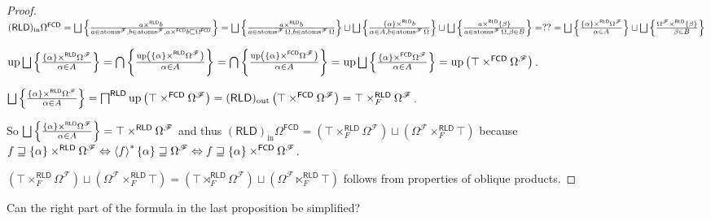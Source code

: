 \begin{proof}
  
  $(\mathsf{RLD})_{\operatorname{in}} \Omega^{\mathsf{FCD}} = \bigsqcup
  \setcond{ a \times^{\mathsf{RLD}} b }{ a \in
  \atoms^{\mathscr{F}}, b \in \atoms^{\mathscr{F}}, a
  \times^{\mathsf{FCD}} b \sqsubseteq \Omega^{\mathsf{FCD}}
  } = 
  \bigsqcup \setcond{ a\times^{\mathsf{RLD}} b}{ a \in \atoms^{\mathscr{F}} \Omega, b \in \atoms^{\mathscr{F}} \Omega } \sqcup
  \bigsqcup \setcond{ \{ \alpha \} \times^{\mathsf{RLD}} b
  }{ \alpha \in A, b \in \atoms^{\mathscr{F}}
  \Omega } \sqcup \bigsqcup \setcond{ a \times^{\mathsf{RLD}} \{
  \beta \} }{ a \in \atoms^{\mathscr{F}}
  \Omega, \beta \in B } = ?? = \bigsqcup \setcond{ \{ \alpha \}
  \times^{\mathsf{RLD}} \Omega^{\mathscr{F}} }{
  \alpha \in A } \sqcup \bigsqcup \setcond{
  \Omega^{\mathscr{F}} \times^{\mathsf{RLD}} \{ \beta \} }{
  \hspace{1em} \beta \in B }$
  
  $\up \bigsqcup \setcond{ \{ \alpha \} \times^{\mathsf{RLD}}
  \Omega^{\mathscr{F}} }{ \alpha \in A } =
  \bigcap \setcond{ \up \left( \{ \alpha \} \times^{\mathsf{RLD}}
  \Omega^{\mathscr{F}} \right) }{ \alpha \in A
  } = \bigcap \setcond{ \up \left( \{ \alpha \}
  \times^{\mathsf{FCD}} \Omega^{\mathscr{F}} \right) }{
  \alpha \in A } = \up \bigsqcup \setcond{ \{ \alpha
  \} \times^{\mathsf{FCD}} \Omega^{\mathscr{F}} }{
  \alpha \in A } = \up \left( \top
  \times^{\mathsf{FCD}} \Omega^{\mathscr{F}} \right)$.
  
  $\bigsqcup \setcond{ \{ \alpha \} \times^{\mathsf{RLD}}
  \Omega^{\mathscr{F}} }{ \alpha \in A } =
  \bigsqcap^{\mathsf{RLD}} \up \left( \top
  \times^{\mathsf{FCD}} \Omega^{\mathscr{F}} \right) =
  (\mathsf{RLD})_{\operatorname{out}}  \left( \top \times^{\mathsf{FCD}}
  \Omega^{\mathscr{F}} \right) = \top \times^{\mathsf{RLD}}_F
  \Omega^{\mathscr{F}}$.
  
  So $\bigsqcup \setcond{ \{ \alpha \} \times^{\mathsf{RLD}}
  \Omega^{\mathscr{F}} }{ \alpha \in A } =
  \top \times^{\mathsf{RLD}} \Omega^{\mathscr{F}}$ and thus
  $(\mathsf{RLD})_{\operatorname{in}} \Omega^{\mathsf{FCD}} = \left(
  \top \times^{\mathsf{RLD}}_F \Omega^{\mathscr{F}} \right) \sqcup
  \left( \Omega^{\mathscr{F}} \times^{\mathsf{RLD}}_F \top \right)$
  because
  $f \sqsupseteq \{ \alpha \} \times^{\mathsf{RLD}}
  \Omega^{\mathscr{F}} \Leftrightarrow \left\langle f\right\rangle ^{\ast} \{ \alpha \}
  \sqsupseteq \Omega^{\mathscr{F}} \Leftrightarrow f \sqsupseteq \{ \alpha \}
  \times^{\mathsf{FCD}} \Omega^{\mathscr{F}}$.
  
  $\left(
  \top \times^{\mathsf{RLD}}_F \Omega^{\mathscr{F}} \right) \sqcup
  \left( \Omega^{\mathscr{F}} \times^{\mathsf{RLD}}_F \top \right) =
  \left(
  \top \rtimes^{\mathsf{RLD}}_F \Omega^{\mathscr{F}} \right) \sqcup
  \left( \Omega^{\mathscr{F}} \ltimes^{\mathsf{RLD}}_F \top \right)$
  follows from properties of oblique products.
\end{proof}

\begin{question}
  Can the right part of the formula in the last proposition be simplified?
\end{question}